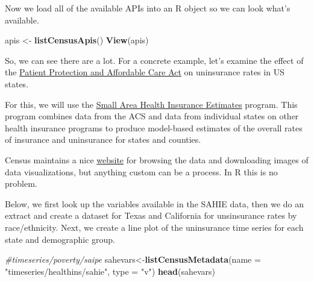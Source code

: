 \documentclass[]{article}
\newenvironment{Shaded}{\begin{snugshade}}{\end{snugshade}}
\newcommand{\KeywordTok}[1]{\textcolor[rgb]{0.13,0.29,0.53}{\textbf{#1}}}
\newcommand{\DataTypeTok}[1]{\textcolor[rgb]{0.13,0.29,0.53}{#1}}
\newcommand{\StringTok}[1]{\textcolor[rgb]{0.31,0.60,0.02}{#1}}
\newcommand{\CommentTok}[1]{\textcolor[rgb]{0.56,0.35,0.01}{\textit{#1}}}
\newcommand{\NormalTok}[1]{#1}
\begin{document}
Now we load all of the available APIs into an R object so we can look
what's available.

\begin{Shaded}
\begin{Highlighting}[]
\NormalTok{apis <-}\StringTok{ }\KeywordTok{listCensusApis}\NormalTok{()}
\KeywordTok{View}\NormalTok{(apis)}
\end{Highlighting}
\end{Shaded}

So, we can see there are a lot. For a concrete example, let's examine
the effect of the
\href{https://en.wikipedia.org/wiki/Patient_Protection_and_Affordable_Care_Act}{Patient
Protection and Affordable Care Act} on uninsurance rates in US states.

For this, we will use the
\href{https://www.census.gov/programs-surveys/sahie.html}{Small Area
Health Insurance Estimates} program. This program combines data from the
ACS and data from individual states on other health insurance programs
to produce model-based estimates of the overall rates of insurance and
uninsurance for states and counties.

Census maintains a nice
\href{https://www.census.gov/data-tools/demo/sahie/\#/}{website} for
browsing the data and downloading images of data visualizations, but
anything custom can be a process. In R this is no problem.

Below, we first look up the variables available in the SAHIE data, then
we do an extract and create a dataset for Texas and California for
unsinsurance rates by race/ethnicity. Next, we create a line plot of the
uninsurance time series for each state and demographic group.

\begin{Shaded}
\begin{Highlighting}[]
\CommentTok{#timeseries/poverty/saipe}
\NormalTok{sahevars<-}\KeywordTok{listCensusMetadata}\NormalTok{(}\DataTypeTok{name =} \StringTok{"timeseries/healthins/sahie"}\NormalTok{, }\DataTypeTok{type =} \StringTok{"v"}\NormalTok{)}
\KeywordTok{head}\NormalTok{(sahevars)}
\end{Highlighting}
\end{Shaded}
\end{document}

